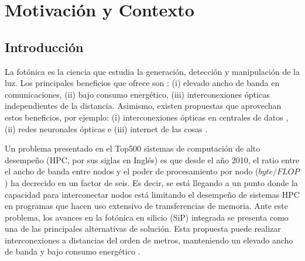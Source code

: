 \chapter{Motivación y Contexto}

\section{Introducción}

La fotónica es la ciencia que estudia la generación, detección y manipulación de la luz. 
Los principales beneficios que ofrece son \citep{Shen2019}:
(i) elevado ancho de banda en comunicaciones, 
(ii) bajo consumo energético,
(iii) interconexiones ópticas independientes de la distancia.
Asimismo, existen propuestas que aprovechan estos beneficios, por ejemplo:
(i) interconexiones ópticas en centrales de datos \citep{Shen2019}, %
(ii) redes neuronales ópticas \citep{Shen2017} e %
(iii) internet de las cosas \citep{Li2021}.



Un problema presentado en el Top500 sistemas de computación de alto desempeño (HPC, por sus siglas en Inglés) es que desde el año 2010, 
el ratio entre el ancho de banda entre nodos y el poder de procesamiento por nodo ($byte / FLOP$) ha decrecido en un factor de seis.
Es decir, se está llegando a un punto donde la capacidad para interconectar nodos está
limitando el desempeño de sistemas HPC en programas que hacen uso extensivo de transferencias de memoria.
Ante este problema, los avances en la fotónica en silicio (SiP) integrada se presenta como una de las principales alternativas de solución. 
Esta propuesta puede realizar interconexiones a distancias del orden de metros,
manteniendo un elevado ancho de banda y bajo consumo energético \citep{Shen2019, Anderson2018}.

